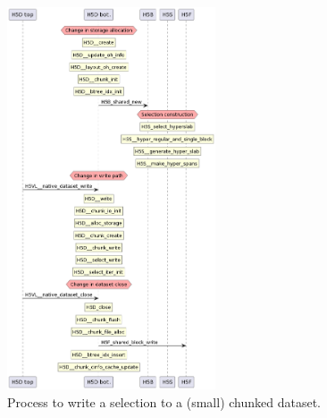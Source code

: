 \begin{figure}
    \centering
    \includegraphics[width=0.55\textwidth]{images/tour_3_uml_dset_write_sel.png}
    \caption{Process to write a selection to a (small) chunked dataset.}
    \label{fig:tour-3-uml-dset-write-chunk}
\end{figure}

